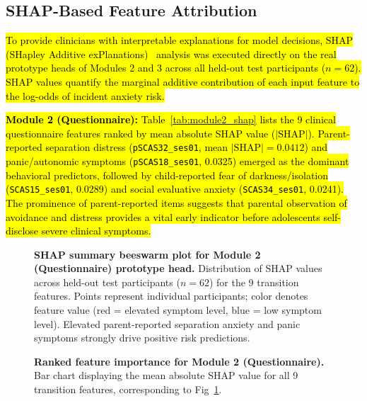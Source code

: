 \documentclass[10pt,letterpaper]{article}
\begin{document}
\subsection*{SHAP-Based Feature Attribution}

\hl{To provide clinicians with interpretable explanations for model decisions, SHAP (SHapley Additive exPlanations)~\cite{ref_shap} analysis was executed directly on the real prototype heads of Modules 2 and 3 across all held-out test participants ($n=62$). SHAP values quantify the marginal additive contribution of each input feature to the log-odds of incident anxiety risk.}

\hl{\textbf{Module 2 (Questionnaire):} Table~\ref{tab:module2_shap} lists the 9 clinical questionnaire features ranked by mean absolute SHAP value ($|\mathrm{SHAP}|$). Parent-reported separation distress (\texttt{pSCAS32\_ses01}, mean $|\mathrm{SHAP}| = 0.0412$) and panic/autonomic symptoms (\texttt{pSCAS18\_ses01}, 0.0325) emerged as the dominant behavioral predictors, followed by child-reported fear of darkness/isolation (\texttt{SCAS15\_ses01}, 0.0289) and social evaluative anxiety (\texttt{SCAS34\_ses01}, 0.0241). The prominence of parent-reported items suggests that parental observation of avoidance and distress provides a vital early indicator before adolescents self-disclose severe clinical symptoms.}

\begin{figure}[!h]
\caption{\textbf{SHAP summary beeswarm plot for Module 2 (Questionnaire) prototype head.}
Distribution of SHAP values across held-out test participants ($n=62$) for the 9 transition features. Points represent individual participants; color denotes feature value (red = elevated symptom level, blue = low symptom level). Elevated parent-reported separation anxiety and panic symptoms strongly drive positive risk predictions.}
\label{fig:module2_shap_summary}
\end{figure}

\begin{figure}[!h]
\caption{\textbf{Ranked feature importance for Module 2 (Questionnaire).}
Bar chart displaying the mean absolute SHAP value for all 9 transition features, corresponding to Fig~\ref{fig:module2_shap_summary}.}
\label{fig:module2_bar}
\end{figure}
\end{document}
